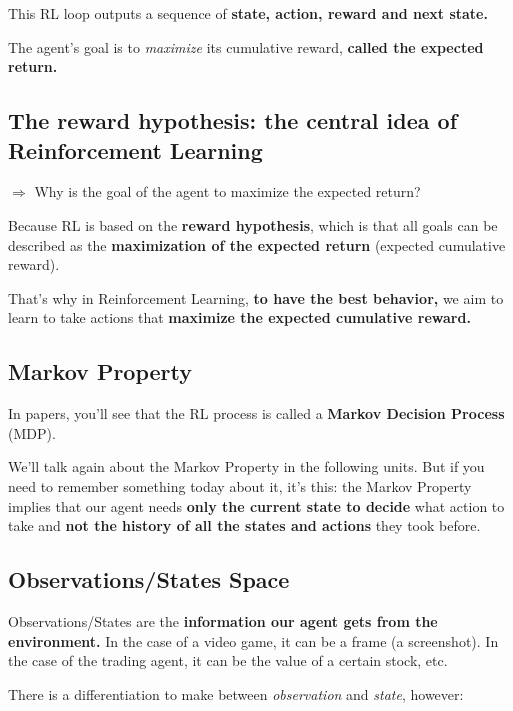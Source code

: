 \documentclass[11pt,a4paper]{article}
\begin{document}
This RL loop outputs a sequence of \textbf{state, action, reward and next state.}


The agent's goal is to \emph{maximize} its cumulative reward, \textbf{called the expected return.}

\subsection{The reward hypothesis: the central idea of Reinforcement Learning}\label{the-reward-hypothesis-the-central-idea-of-reinforcement-learning}

\(\Rightarrow\) Why is the goal of the agent to maximize the expected return?

Because RL is based on the \textbf{reward hypothesis}, which is that all goals can be described as the \textbf{maximization of the expected return} (expected cumulative reward).

That's why in Reinforcement Learning, \textbf{to have the best behavior,} we aim to learn to take actions that \textbf{maximize the expected cumulative reward.}

\subsection{Markov Property}\label{markov-property}

In papers, you'll see that the RL process is called a \textbf{Markov Decision Process} (MDP).

We'll talk again about the Markov Property in the following units. But if you need to remember something today about it, it's this: the Markov Property implies that our agent needs \textbf{only the current state to decide} what action to take and \textbf{not the history of all the states and actions} they took before.

\subsection{Observations/States Space}\label{observationsstates-space}

Observations/States are the \textbf{information our agent gets from the environment.} In the case of a video game, it can be a frame (a screenshot). In the case of the trading agent, it can be the value of a certain stock, etc.

There is a differentiation to make between \emph{observation} and \emph{state}, however:
\end{document}

